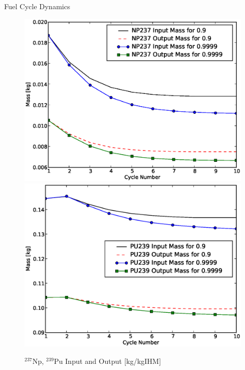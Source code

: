 \documentclass[pdf, autumn, slideColor, nocolorBG]{prosper}
\newcommand{\superscript}[1]{\ensuremath{^{\textrm{#1}}}}
\newcommand{\nuc}[2]{\superscript{#2}{#1}}
\begin{document}
\begin{slide}{Fuel Cycle Dynamics}
\vspace{0.75cm}
\begin{center}
\begin{figure}
\caption{\nuc{Np}{237}, \nuc{Pu}{239} Input and Output [kg/kgIHM]}
\includegraphics[scale=0.275]{../se_sensitivity/figs/NP237InOutSepEff.eps} 
\includegraphics[scale=0.275]{../se_sensitivity/figs/PU239InOutSepEff.eps}
\end{figure}
\end{center}
\end{slide}
\end{document}
